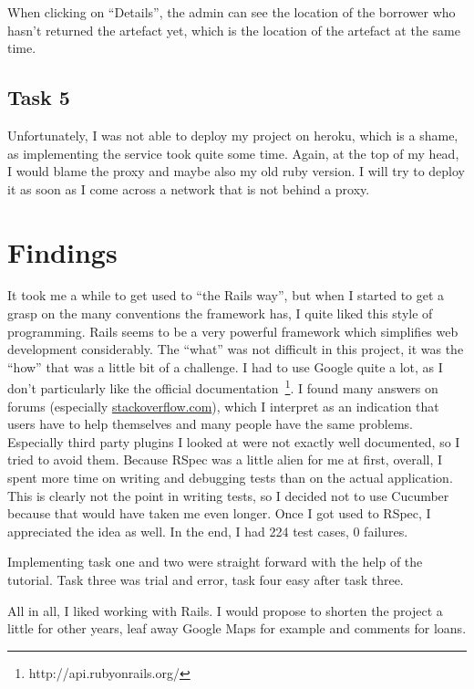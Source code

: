 \documentclass[fontsize=12pt,paper=a4]{scrartcl}
\begin{document}
When clicking on ``Details'', the admin can see the location of the borrower who hasn't returned the artefact yet, which is the location of the artefact at the same time. 


\subsection{Task 5}
Unfortunately, I was not able to deploy my project on heroku, which is a shame, as implementing the service took quite some time. Again, at the top of my head, I would blame the proxy and maybe also my old ruby version. I will try to deploy it as soon as I come across a network that is not behind a proxy.

\section{Findings}
It took me a while to get used to ``the Rails way'', but when I started to get a grasp on the many conventions the framework has, I quite liked this style of programming. Rails seems to be a very powerful framework which simplifies web development considerably.
The ``what'' was not difficult in this project, it was the ``how'' that was a little bit of a challenge. I had to use Google quite a lot, as I don't particularly like the official documentation~\footnote{http://api.rubyonrails.org/}. I found many answers on forums (especially \url{stackoverflow.com}), which I interpret as an indication that users have to help themselves and many people have the same problems. Especially third party plugins I looked at were not exactly well documented, so I tried to avoid them.
Because RSpec was a little alien for me at first, overall, I spent more time on writing and debugging tests than on the actual application. This is clearly not the point in writing tests, so I decided not to use Cucumber because that would have taken me even longer. Once I got used to RSpec, I appreciated the idea as well. In the end, I had 224 test cases, 0 failures.

Implementing task one and two were straight forward with the help of the tutorial. Task three was trial and error, task four easy after task three.

All in all, I liked working with Rails. I would propose to shorten the project a little for other years, leaf away Google Maps for example and comments for loans.
\end{document}
